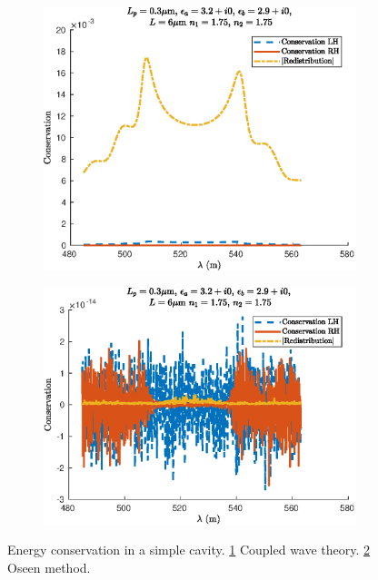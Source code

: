 \begin{figure}
	\centering
	\begin{subfigure}{0.49\linewidth}
		\includegraphics[width=\linewidth]{plots/simple/energy_cwt}
		\caption{}
		\label{fig:energy_cwt}
	\end{subfigure}
	\begin{subfigure}{0.49\linewidth}
		\includegraphics[width=\linewidth]{plots/simple/energy_oseen}
		\caption{}
		\label{fig:energy_oseen}
	\end{subfigure}
	\caption[Energy conservation in a simple cavity]{Energy conservation in a simple cavity. \ref{fig:energy_cwt} Coupled wave theory. \ref{fig:energy_oseen} Oseen method.}
	\label{fig:simple_cavity:energy_conservation}
\end{figure}

